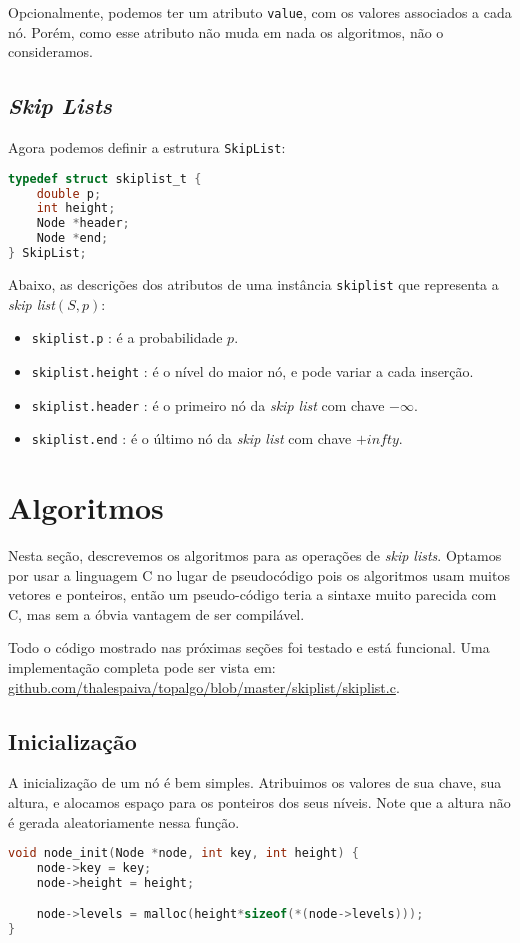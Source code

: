 \documentclass[paper=a4, fontsize=11pt]{scrartcl} %
\numberwithin{equation}{section}
\numberwithin{figure}{section}
\numberwithin{table}{section}
\numberwithin{definition}{section}
\numberwithin{theorem}{section}
\numberwithin{property}{section}
\numberwithin{proposition}{section}
\newcommand{\SLs}{\textit{Skip Lists}\xspace}
\newcommand{\sls}{\textit{skip lists}\xspace}
\newcommand{\skl}{\textit{skip list}\xspace}
\renewcommand{\sl}{\textit{skip list}\xspace}
\begin{document}
Opcionalmente, podemos ter um atributo \verb|value|, com os valores associados a cada nó. Porém, como esse
atributo não muda em nada os algoritmos, não o consideramos.

\subsection{\SLs}
Agora podemos definir a estrutura \verb|SkipList|:
\begin{lstlisting}[language=C]
typedef struct skiplist_t {
    double p;
    int height;
    Node *header;
    Node *end;
} SkipList;
\end{lstlisting}

Abaixo, as descrições dos atributos de uma instância \verb|skiplist| que representa a 
\skl $( S, p )$:

\begin{itemize}[noitemsep]
  \item \verb|skiplist.p| : é a probabilidade $p$.
  \item \verb|skiplist.height| : é o nível do maior nó, e pode variar a cada inserção.
  \item \verb|skiplist.header| : é o primeiro nó da \sl com chave $-\infty$.
  \item \verb|skiplist.end| : é o último nó da \sl com chave $+infty$.
\end{itemize}


\section{Algoritmos}

Nesta seção, descrevemos os algoritmos para as operações de \sls. Optamos por usar a linguagem C no lugar de 
pseudocódigo pois os algoritmos usam muitos vetores e ponteiros, então um pseudo-código teria a sintaxe muito parecida com
C, mas sem a óbvia vantagem de ser compilável. 

Todo o código mostrado nas próximas seções foi testado e está funcional. Uma implementação completa pode ser vista 
em: \url{github.com/thalespaiva/topalgo/blob/master/skiplist/skiplist.c}.
  
\subsection{Inicialização}

A inicialização de um nó é bem simples. Atribuimos os valores de sua chave, sua altura, e alocamos espaço
para os ponteiros dos seus níveis. Note que a altura não é gerada aleatoriamente nessa função.
\begin{lstlisting}[caption=Inicialização de um nó., language=C]
void node_init(Node *node, int key, int height) {
    node->key = key;
    node->height = height;

    node->levels = malloc(height*sizeof(*(node->levels)));
}
\end{lstlisting}
\end{document}
